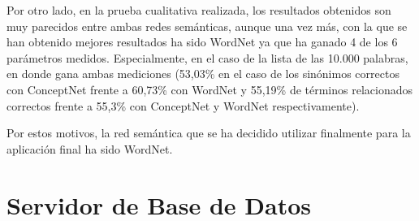 Por otro lado, en la prueba cualitativa realizada, los resultados obtenidos son muy parecidos entre ambas redes semánticas, aunque una vez más, con la que se han obtenido mejores resultados ha sido WordNet ya que ha ganado 4 de los 6 parámetros medidos. Especialmente, en el caso de la lista de las 10.000 palabras, en donde gana ambas mediciones (53,03\% en el caso de los sinónimos correctos con ConceptNet frente a 60,73\% con WordNet y 55,19\% de términos relacionados correctos frente a 55,3\% con ConceptNet y WordNet respectivamente).

Por estos motivos, la red semántica que se ha decidido utilizar finalmente para la aplicación final ha sido WordNet.



\section{Servidor de Base de Datos}

